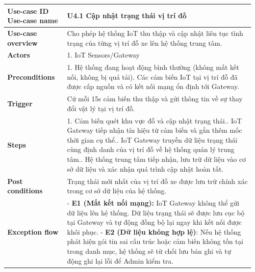 
\vspace{0.5cm}
\noindent
\begin{tabularx}{\textwidth}{|>{\raggedright\arraybackslash}p{4cm}|X|}
\hline
\textbf{Use-case ID} \newline \textbf{Use-case name} & U4.1 \newline \textbf{Cập nhật trạng thái vị trí đỗ} \\ \hline
\textbf{Use-case overview} & Cho phép hệ thống IoT thu thập và cập nhật liên tục tình trạng của từng vị trí đỗ xe lên hệ thống trung tâm. \\ \hline
\textbf{Actors} & 1. IoT Sensors/Gateway \\ \hline
\textbf{Preconditions} & 
1. Hệ thống đang hoạt động bình thường (không mất kết nối, không bị quá tải)\newline
2. Các cảm biến IoT tại vị trí đỗ đã được cấp nguồn và có kết nối mạng ổn định tới Gateway. \\ \hline
\textbf{Trigger} & Cứ mỗi 15s cảm biến thu thập và gửi thông tin về sự thay đổi vật lý tại vị trí đỗ. \\ \hline
\textbf{Steps} & 
1. Cảm biến quét khu vực đỗ và cập nhật trạng thái.\newline
2. IoT Gateway tiếp nhận tín hiệu từ cảm biến và gắn thêm mốc thời gian cụ thể.\newline
3. IoT Gateway truyền dữ liệu trạng thái cùng định danh của vị trí đỗ về hệ thống quản lý trung tâm.\newline
4. Hệ thống trung tâm tiếp nhận, lưu trữ dữ liệu vào cơ sở dữ liệu và xác nhận quá trình cập nhật hoàn tất. \\ \hline
\textbf{Post conditions} & Trạng thái mới nhất của vị trí đỗ xe được lưu trữ chính xác trong cơ sở dữ liệu của hệ thống. \\ \hline
\textbf{Exception flow} & 
- \textbf{E1 (Mất kết nối mạng):} IoT Gateway không thể gửi dữ liệu lên hệ thống. Dữ liệu trạng thái sẽ được lưu cục bộ tại Gateway và tự động đồng bộ lại ngay khi kết nối được khôi phục. \newline 
- \textbf{E2 (Dữ liệu không hợp lệ)}: Nếu hệ thống phát hiện gói tin sai cấu trúc hoặc cảm biến không tồn tại trong danh mục, hệ thống sẽ từ chối lưu bản ghi và tự động ghi lại lỗi để Admin kiểm tra. \\ \hline
\end{tabularx}
\newpage




